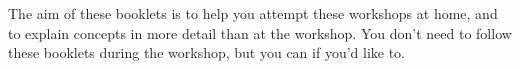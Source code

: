 The aim of these booklets is to help you attempt these workshops at home, and to explain concepts in more detail than at the workshop. You don't need to follow these booklets during the workshop, but you can if you'd like to.